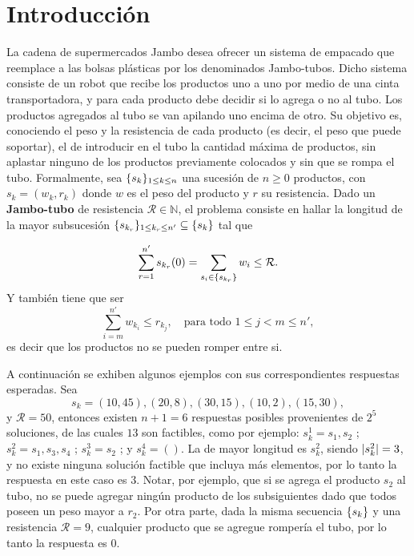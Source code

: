 \documentclass{article}
\DeclarePairedDelimiter\abs{\lvert}{\rvert}
\DeclarePairedDelimiter\curl{\{}{\}}
\newcommand{\sqe}[4]{\curl{#1_{#2}}_{#3 \leq #2 \leq #4}}
\newcommand{\Res}{\mathcal{R}}
\begin{document}




\maketitle

\newpage
\setcounter{page}{1}

\section{Introducción} \label{sec:introduccion}
La cadena de supermercados Jambo desea ofrecer un sistema de empacado que reemplace a las bolsas plásticas por los denominados Jambo-tubos. Dicho sistema consiste de un robot que recibe los productos uno a uno por medio de una cinta transportadora, y para cada producto debe decidir si lo agrega o no al tubo. Los productos agregados al tubo se van apilando uno encima de otro. Su objetivo es, conociendo el peso y la resistencia de cada producto (es decir, el peso que puede soportar), el de introducir en el tubo la cantidad máxima de productos, sin aplastar ninguno de los productos previamente colocados y sin que se rompa el tubo. Formalmente, sea $\sqe{s}{k}{1}{n}$ una sucesión de $n \geq 0$ productos, con $s_{k} =  (w_{k}, r_{k})$ donde $w$ es el peso del producto y $r$ su resistencia. Dado un \textbf{Jambo-tubo} de resistencia $\Res \in \mathbb{N}$, el problema consiste en hallar la longitud de la  mayor subsucesión $\sqe{s}{k_{r}}{1}{n'} \subseteq \curl{s_{k}}$ tal que

\[
    \sum_{r = 1}^{n'}{s_{k_{r}}}(0) = \sum_{s_{i} \in \curl{s_{k_{r}}} }{w_{i}} \leq \Res. 
\]
Y también tiene que ser
\[
    \sum_{i = m}^{n'}{w_{k_{i}}} \leq r_{k_{j}}, \quad \text{para todo } 1 \leq j < m \leq n',
\]
es decir que los productos no se pueden romper entre si.

A continuación se exhiben algunos ejemplos con sus correspondientes respuestas esperadas. Sea
\[
    s_{k} = (10,45),(20,8),(30,15),(10,2),(15,30),
\]
y $\Res=50$, entonces existen $n+1=6$ respuestas posibles provenientes de $2^5$ soluciones, de las cuales $13$ son factibles, como por ejemplo: $s^{1}_{k}=s_1,s_2$ ; $s^{2}_{k}=s_1,s_3,s_4$ ; $s^{3}_k=s_2$ ; y $s^{4}_{k} = ()$. La de mayor longitud es $s^{2}_{k}$, siendo $\abs{s^{2}_{k}}=3$, y no existe ninguna solución factible que incluya más elementos, por lo tanto la respuesta en este caso es $3$. Notar, por ejemplo, que si se agrega el producto $s_2$ al tubo, no se puede agregar ningún producto de los subsiguientes dado que todos poseen un peso mayor a $r_2$. Por otra parte, dada la misma secuencia $\curl{s_{k}}$ y una resistencia $\Res=9$, cualquier producto que se agregue rompería el tubo, por lo tanto la respuesta es $0$.
\end{document}
